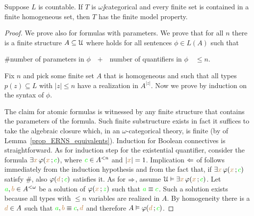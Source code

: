 \documentclass[creche.tex]{subfiles}
\begin{document}
\begin{lemma}\label{lem_zilbergiocattolo} Suppose $L$ is countable. If $T$ is $\omega\jj$categorical and every finite set is contained in a finite homogeneous set, then $T$ has the finite model property.
\end{lemma}
\begin{proof}
We prove  also for formulas with parameters. We prove that for all $n$ there is a finite structure $A\subseteq\EuScript U$ where  holds for all sentences $\phi\in L(A)$ such that

$\#$\hfil number of parameters in $\phi$\ \  $+$\ \  number of quantifiers in $\phi$\ \ $\le n$.

Fix $n$ and pick some finite set $A$ that is homogeneous and such that all types $p(z)\subseteq L$ with $|z|\le n$ have a realization in $A^{|z|}$. Now we prove  by induction on the syntax of $\phi$.

The claim for atomic formulas is witnessed by any finite structure that contains the parameters of the formula. Such finite substructure exists in fact it suffices to take the algebraic closure which, in an $\omega$-categorical theory, is finite (by  of Lemma~\ref{prop_ERNS_equivalents}). Induction for Boolean connectives is straightforward. As for induction step for the existential quantifier, consider the formula $\exists {\color{brown}x}\,\varphi({\color{brown} x}\,;{\color{green} c})$, where ${\color{green} c}\in A^{<n}$ and $|{\color{brown} x}|=1$. Implication $\Leftarrow$ of  follows immediately from the induction hypothesis and from the fact that, if $\exists {\color{brown}x}\,\varphi({\color{brown} x}\,;{\color{green} c})$ satisfy $\#$, also $\varphi({\color{brown} d}\,;{\color{green} c})$ satisfies it. As for $\Rightarrow$, assume $\EuScript U\vDash\exists {\color{brown}x}\, \varphi({\color{brown} x}\,;{\color{green} c})$. Let ${\color{green} a},{\color{brown} b}\in A^{<\omega}$ be a solution of $\varphi({\color{brown} x}\,;{\color{green} z})$ such that ${\color{green} a}\equiv{\color{green}c}$. Such a solution exists because all types with $\le n$ variables are realized in $A$. By homogeneity there is a ${\color{brown} d}\in A$ such that ${\color{green} a},{\color{brown} b}\equiv {\color{green}c},{\color{brown} d}$ and therefore $A\vDash\varphi({\color{brown} d}\,;{\color{green} c})$.
%
\end{proof}
\end{document}
